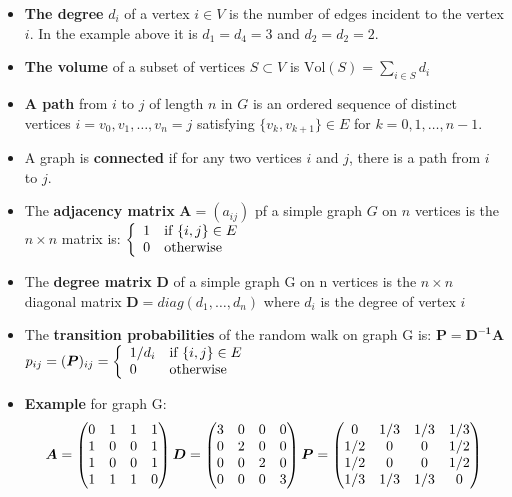 \begin{itemize}
	\item \textbf{The degree} $d_i$ of a vertex $i \in V$ is the number of edges incident to the vertex $i$. In the example above it is $d_1=d_4=3$ and $d_2=d_2=2$.
	\item \textbf{The volume} of a subset of vertices $S \subset V$ is \qquad $\text{Vol}(S)=\sum\limits_{i\in S}^{} d_i$
	\item \textbf{A path} from $i$ to $j$ of length $n$ in $G$ is an ordered sequence of distinct vertices $i=v_0,v_1,\ldots,v_n=j$ satisfying $\{v_k,v_{k+1}\} \in E$ for $k=0,1,\ldots,n-1$.
	\item A graph is \textbf{connected} if for any two vertices $i$ and $j$, there is a path from $i$ to $j$.
	\item The \textbf{adjacency matrix} $\bm{A}=(a_{ij})$ pf a simple graph $G$ on $n$ vertices is the $n \times n$  matrix is: $\left\{ \begin{array}{ll} 1 & \mbox{if } \{i,j\} \in E \\ 0 & \mbox{otherwise } \end{array} \right.$
	\item The \textbf{degree matrix} $\bm{D}$ of a simple graph G on n vertices is the $n \times n$ diagonal matrix $\bm{D}=diag(d_1,\ldots,d_n)$ where $d_i$ is the degree of vertex $i$
	\item The \textbf{transition probabilities} of the random walk on graph G is: $\bm{P}=\bm{D^{-1}A}$ \qquad $p_{ij}=(\boldsymbol{P})_{ij}=\left\{ \begin{array}{ll} 1/d_i & \mbox{if } \{i,j\} \in E \\ 0 & \mbox{otherwise } \end{array} \right.$
	\item \textbf{Example} for graph G:\\
	\begin{equation}
		\boldsymbol{A}=\begin{pmatrix}
			0 & 1 & 1 & 1\\
			1 & 0 & 0 & 1\\
			1 & 0 & 0 & 1\\
			1 & 1 & 1 & 0
		\end{pmatrix}\\
		\boldsymbol{D}=\begin{pmatrix}
			3 & 0 & 0 & 0\\
			0 & 2 & 0 & 0\\
			0 & 0 & 2 & 0\\
			0 & 0 & 0 & 3
		\end{pmatrix}\\
		\boldsymbol{P}=\begin{pmatrix}
			0 & 1/3 & 1/3 & 1/3\\
			1/2 & 0 & 0 & 1/2\\
			1/2 & 0 & 0 & 1/2\\
			1/3 & 1/3 & 1/3 & 0
		\end{pmatrix}\\
	\end{equation}\nonumber
\end{itemize}

